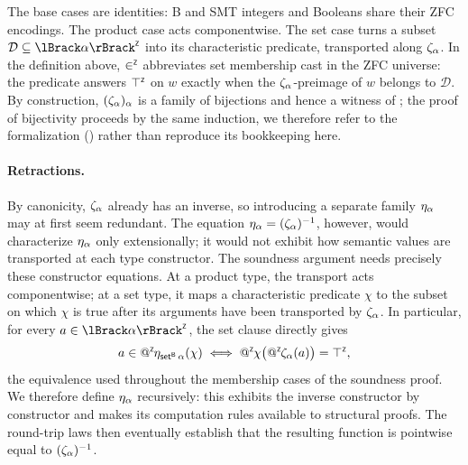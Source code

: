 The base cases are identities: B and SMT integers and Booleans share their ZFC encodings.
The product case acts componentwise.
The set case turns a subset \(\mathcal{D} \subseteq \interpZ{\alpha}\) into its characteristic predicate, transported along \(\zeta_{\alpha}\).
In the definition above, \(\mathbin{\in^{\scriptscriptstyle{\mathsf{Z}}}}\) abbreviates set membership cast in the ZFC universe: the predicate answers \(\top^{\scriptscriptstyle{\mathsf{Z}}}\) on \(w\) exactly when the \(\zeta_{\alpha}\)-preimage of \(w\) belongs to \(\mathcal{D}\).
By construction, \((\zeta_{\alpha})_\alpha\) is a family of bijections and hence a witness of ; the proof of bijectivity proceeds by the same induction, we therefore refer to the formalization ({\small{}}) rather than reproduce its bookkeeping here.

\paragraph{Retractions.}
By canonicity, \(\zeta_{\alpha}\) already has an inverse, so introducing a separate family \(\eta_{\alpha}\) may at first seem redundant.
The equation \(\eta_{\alpha} = (\zeta_{\alpha})^{-1}\), however, would characterize \(\eta_{\alpha}\) only extensionally; it would not exhibit how semantic values are transported at each type constructor.
The soundness argument needs precisely these constructor equations.
At a product type, the transport acts componentwise; at a set type, it maps a characteristic predicate \(\chi\) to the subset on which \(\chi\) is true after its arguments have been transported by \(\zeta_{\alpha}\).
In particular, for every \(a \in \interpZ{\alpha}\), the set clause directly gives
\[
  a \in \mathop{@^{\scriptscriptstyle{\mathsf{Z}}}}\mkern-4mu\eta_{\mathsf{set}^{\scriptscriptstyle{\mathsf{B}}}\,\alpha}(\chi)
  \iff
  \mathop{@^{\scriptscriptstyle{\mathsf{Z}}}}\mkern-4mu \chi\bigl(\mathop{@^{\scriptscriptstyle{\mathsf{Z}}}}\mkern-4mu\zeta_{\alpha}(a)\bigr) = \top^{\scriptscriptstyle{\mathsf{Z}}},
\]
the equivalence used throughout the membership cases of the soundness proof.
We therefore define \(\eta_{\alpha}\) recursively: this exhibits the inverse constructor by constructor and makes its computation rules available to structural proofs.
The round-trip laws then eventually establish that the resulting function is pointwise equal to \((\zeta_{\alpha})^{-1}\).

